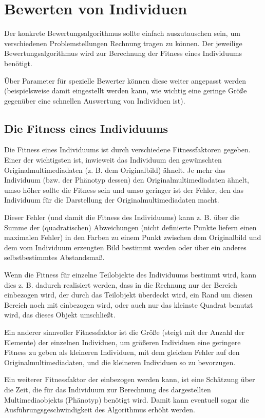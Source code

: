 \section{Bewerten von Individuen}

Der konkrete Bewertungsalgorithmus sollte einfach auszutauschen sein, um verschiedenen Problemstellungen Rechnung tragen zu können. Der jeweilige Bewertungsalgorithmus wird zur Berechnung der Fitness eines Individuums benötigt.

Über Parameter für spezielle Bewerter können diese weiter angepasst werden (beispielsweise damit eingestellt werden kann, wie wichtig eine geringe Größe gegenüber eine schnellen Auswertung von Individuen ist).


\subsection{Die Fitness eines Individuums}

Die Fitness eines Individuums ist durch verschiedene Fitnessfaktoren gegeben.
Einer der wichtigsten ist, inwieweit das Individuum den gewünschten Originalmultimediadaten (z. B. dem Originalbild) ähnelt. Je mehr das Individuum (bzw. der Phänotyp dessen) den Originalmultimediadaten ähnelt, umso höher sollte die Fitness sein und umso geringer ist der Fehler, den das Individuum für die Darstellung der Originalmultimediadaten macht.

Dieser Fehler (und damit die Fitness des Individuums) kann z. B. über die Summe der (quadratischen) Abweichungen (nicht definierte Punkte liefern einen maximalen Fehler) in den Farben zu einem Punkt zwischen dem Originalbild und dem vom Individuum erzeugten Bild bestimmt werden oder über ein anderes selbstbestimmtes Abstandsmaß.

Wenn die Fitness für einzelne Teilobjekte des Individuums bestimmt wird, kann dies z. B. dadurch realisiert werden, dass in die Rechnung nur der Bereich einbezogen wird, der durch das Teilobjekt überdeckt wird, ein Rand um diesen Bereich noch mit einbezogen wird, oder auch nur das kleinste Quadrat benutzt wird, das dieses Objekt umschließt.

Ein anderer sinnvoller Fitnessfaktor ist die Größe (steigt mit der Anzahl der Elemente) der einzelnen Individuen, um größeren Individuen eine geringere Fitness zu geben als kleineren Individuen, mit dem gleichen Fehler auf den Originalmultimediadaten, und die kleineren Individuen so zu bevorzugen.

Ein weiterer Fitnessfaktor der einbezogen werden kann, ist eine Schätzung über die Zeit, die für das Individuum zur Berechnung des dargestellten Multimediaobjekts (Phänotyp) benötigt wird. Damit kann eventuell sogar die Ausführungsgeschwindigkeit des Algorithmus erhöht werden.


